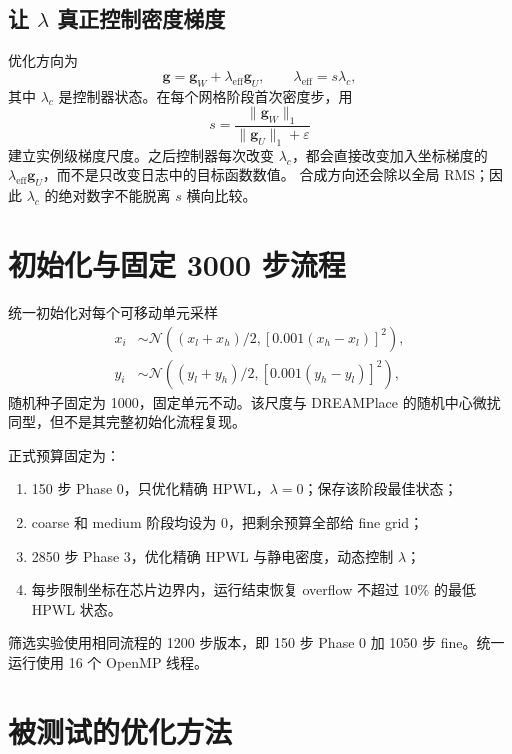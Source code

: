 \documentclass[UTF8,fontset=windows,a4paper,11pt]{ctexart}
\begin{document}
\subsection{让 $\lambda$ 真正控制密度梯度}

优化方向为
\begin{equation}
 \bm g=\bm g_W+\lambda_{\mathrm{eff}}\bm g_U,
 \qquad \lambda_{\mathrm{eff}}=s\lambda_c,
 \label{eq:combined}
\end{equation}
其中 $\lambda_c$ 是控制器状态。在每个网格阶段首次密度步，用
\begin{equation}
 s=\frac{\lVert\bm g_W\rVert_1}{\lVert\bm g_U\rVert_1+\varepsilon}
 \label{eq:scale}
\end{equation}
建立实例级梯度尺度。之后控制器每次改变 $\lambda_c$，都会直接改变加入坐标梯度的
$\lambda_{\mathrm{eff}}\bm g_U$，而不是只改变日志中的目标函数数值。
合成方向还会除以全局 RMS；因此 $\lambda_c$ 的绝对数字不能脱离 $s$ 横向比较。

\section{初始化与固定 3000 步流程}

统一初始化对每个可移动单元采样
\begin{align}
 x_i&\sim\mathcal N\!\left((x_l+x_h)/2,[0.001(x_h-x_l)]^2\right),\\
 y_i&\sim\mathcal N\!\left((y_l+y_h)/2,[0.001(y_h-y_l)]^2\right),
\end{align}
随机种子固定为 1000，固定单元不动。该尺度与 DREAMPlace 的随机中心微扰同型，但不是其完整初始化流程复现。

正式预算固定为：
\begin{enumerate}
  \item 150 步 Phase 0，只优化精确 HPWL，$\lambda=0$；保存该阶段最佳状态；
  \item coarse 和 medium 阶段均设为 0，把剩余预算全部给 fine grid；
  \item 2850 步 Phase 3，优化精确 HPWL 与静电密度，动态控制 $\lambda$；
  \item 每步限制坐标在芯片边界内，运行结束恢复 overflow 不超过 10\% 的最低 HPWL 状态。
\end{enumerate}
筛选实验使用相同流程的 1200 步版本，即 150 步 Phase 0 加 1050 步 fine。统一运行使用 16 个 OpenMP 线程。

\section{被测试的优化方法}
\end{document}
